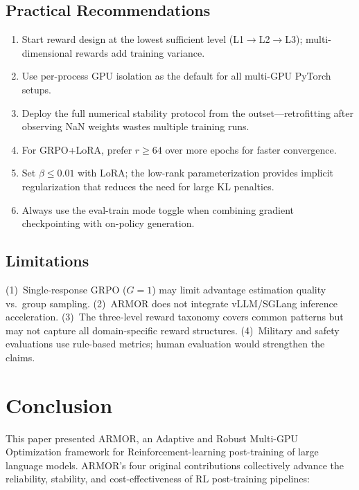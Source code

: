 \documentclass{ieeeaccess}
\begin{document}
\subsection{Practical Recommendations}
\begin{enumerate}
\item Start reward design at the lowest sufficient level (L1$\to$L2$\to$L3);
      multi-dimensional rewards add training variance.
\item Use per-process GPU isolation as the default for all multi-GPU PyTorch setups.
\item Deploy the full numerical stability protocol from the outset---retrofitting
      after observing NaN weights wastes multiple training runs.
\item For GRPO+LoRA, prefer $r \geq 64$ over more epochs for faster convergence.
\item Set $\beta \leq 0.01$ with LoRA; the low-rank parameterization provides
      implicit regularization that reduces the need for large KL penalties.
\item Always use the eval-train mode toggle when combining gradient checkpointing
      with on-policy generation.
\end{enumerate}

\subsection{Limitations}
(1)~Single-response GRPO ($G=1$) may limit advantage estimation quality vs.\ group sampling.
(2)~ARMOR does not integrate vLLM/SGLang inference acceleration.
(3)~The three-level reward taxonomy covers common patterns but may not
capture all domain-specific reward structures.
(4)~Military and safety evaluations use rule-based metrics; human
evaluation would strengthen the claims.

\section{Conclusion}
\label{sec:conclusion}

This paper presented ARMOR, an Adaptive and Robust Multi-GPU Optimization framework
for Reinforcement-learning post-training of large language models.
ARMOR's four original contributions collectively advance the reliability, stability,
and cost-effectiveness of RL post-training pipelines:
\end{document}
